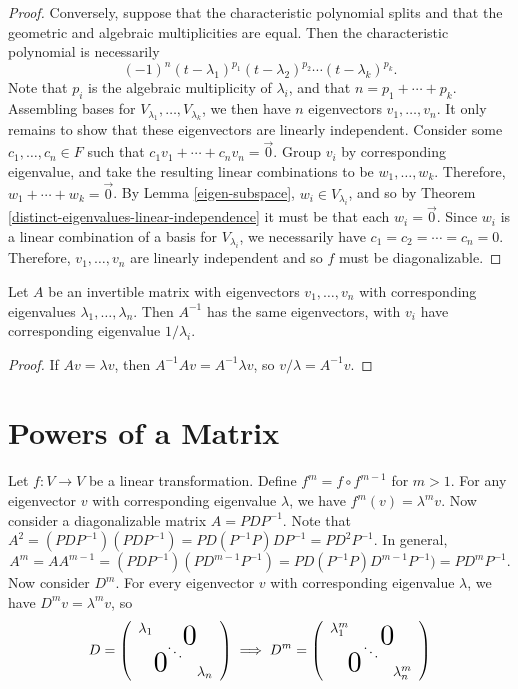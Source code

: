 \begin{proof}
    Conversely, suppose that the characteristic polynomial splits and that the geometric and algebraic multiplicities are equal. Then the characteristic polynomial is necessarily
    \[(-1)^n(t-\lambda_1)^{p_1}(t-\lambda_2)^{p_2}\cdots(t-\lambda_k)^{p_k}.\]
    Note that $p_i$ is the algebraic multiplicity of $\lambda_i$, and that $n = p_1 + \cdots + p_k$. Assembling bases for $V_{\lambda_1}, \ldots, V_{\lambda_k}$, we then have $n$ eigenvectors $v_1, \ldots, v_n$. It only remains to show that these eigenvectors are linearly independent. Consider some $c_1, \ldots, c_n \in F$ such that $c_1v_1 + \cdots + c_nv_n = \vec{0}$. Group $v_i$ by corresponding eigenvalue, and take the resulting linear combinations to be $w_1, \ldots, w_k$. Therefore, $w_1 + \cdots + w_k = \vec{0}$. By Lemma \ref{eigen-subspace}, $w_i \in V_{\lambda_i}$, and so by Theorem \ref{distinct-eigenvalues-linear-independence} it must be that each $w_i = \vec{0}$. Since $w_i$ is a linear combination of a basis for $V_{\lambda_i}$, we necessarily have $c_1 = c_2 = \cdots = c_n = 0$. Therefore, $v_1, \ldots, v_n$ are linearly independent and so $f$ must be diagonalizable.
\end{proof}

\begin{thm}
    Let $A$ be an invertible matrix with eigenvectors $v_1, \ldots, v_n$ with corresponding eigenvalues $\lambda_1, \ldots, \lambda_n$. Then $A^{-1}$ has the same eigenvectors, with $v_i$ have corresponding eigenvalue $1/\lambda_i$.
\end{thm}

\begin{proof}
    If $Av = \lambda v$, then $A^{-1}Av = A^{-1}\lambda v$, so $v/\lambda = A^{-1}v$.
\end{proof}

\section{Powers of a Matrix}

Let $f: V \to V$ be a linear transformation. Define $f^m = f \circ f^{m-1}$ for $m > 1$. For any eigenvector $v$ with corresponding eigenvalue $\lambda$, we have $f^m(v) = \lambda^{m}v$. Now consider a diagonalizable matrix $A = PDP^{-1}$. Note that $A^2 = (PDP^{-1})(PDP^{-1}) = PD(P^{-1}P)DP^{-1} = PD^2P^{-1}$. In general, \[A^m = AA^{m-1} = (PDP^{-1})(PD^{m-1}P^{-1}) = PD(P^{-1}P)D^{m-1}P^{-1}) = PD^mP^{-1}.\] Now consider $D^m$. For every eigenvector $v$ with corresponding eigenvalue $\lambda$, we have $D^mv = \lambda^mv$, so
\[D = \left(\begin{array}{ccc}
    \lambda_1 & \largeblock{2}{-0.7}{0} \\
    & \ddots & \\
    \largeblock{2}{0.7}{0} & \lambda_n \\
\end{array}
\right) \implies D^m =\left(\begin{array}{ccc}
    \lambda_1^m & \largeblock{2}{-0.7}{0} \\
    & \ddots & \\
    \largeblock{2}{0.7}{0} & \lambda_n^m \\
\end{array}
\right)\]

